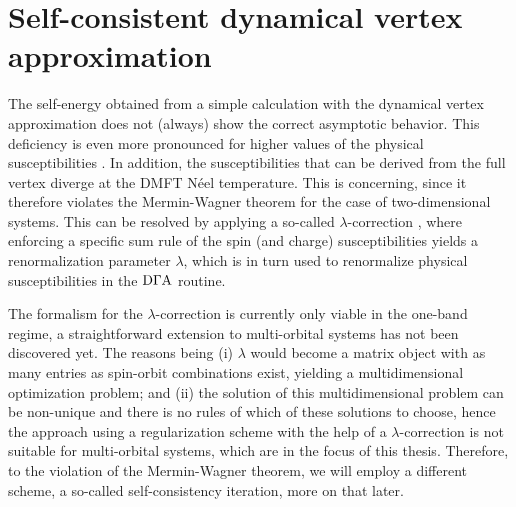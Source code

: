 \documentclass[../../main.tex]{subfiles}
\begin{document}
\section{Self-consistent dynamical vertex approximation}

The self-energy obtained from a simple  calculation with the dynamical vertex approximation does not (always) show the correct asymptotic behavior. This deficiency is even more pronounced for higher values of the physical susceptibilities \cite{sc ladder dga josef}. In addition, the susceptibilities that can be derived from the full vertex diverge at the DMFT Néel temperature. This is concerning, since it therefore violates the Mermin-Wagner theorem \cite{mermin-wagner} for the case of two-dimensional systems. This can be resolved by applying a so-called $\lambda$-correction \cite{moriya}, where enforcing a specific sum rule of the spin (and charge) susceptibilities yields a renormalization parameter $\lambda$, which is in turn used to renormalize physical susceptibilities in the $\text{D}\Gamma\text{A}$ routine.

The formalism for the $\lambda$-correction is currently only viable in the one-band regime, a straightforward extension to multi-orbital systems has not been discovered yet. The reasons being (i) $\lambda$ would become a matrix object with as many entries as spin-orbit combinations exist, yielding a multidimensional optimization problem; and (ii) the solution of this multidimensional problem can be non-unique and there is no rules of which of these solutions to choose, hence the approach using a regularization scheme with the help of a $\lambda$-correction is not suitable for multi-orbital systems, which are in the focus of this thesis. Therefore, to  the violation of the Mermin-Wagner theorem, we will employ a different scheme, a so-called self-consistency iteration, more on that later. 
\end{document}
